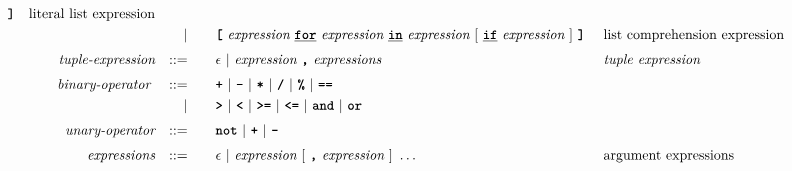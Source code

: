 \begin{alignat*}{9}
                                            \textbf{\texttt{]}}
                                                           && \textrm{literal list expression}\\
&&                       && |   &\quad &&   \textbf{\texttt{[}}\ \textit{expression} \     \textbf{\texttt{\underline{for}}} \ \textit{expression} \ \textbf{\texttt{\underline{in}}} \
                                            \textit{expression} \ [ \ \underline{\textbf{\texttt{if}}} \ \textit{expression} \ ]  \ \textbf{\texttt{]}} \ && \textrm{list comprehension expression}\\[1mm]
&& \textit{tuple-expression}   && ::= &\quad &&  \epsilon \ | \ \textit{expression} \ \textbf{\texttt{,}} \ \textit{expressions}  && \textit{tuple expression}  \\[1mm]
&& \textit{binary-operator}    \ 
                        && ::= &\quad && \textbf{\texttt{+}}\ |\ \textbf{\texttt{-}}\ |\ \textbf{\texttt{*}}\ |\ \textbf{\texttt{/}}\ |\ \textbf{\texttt{\%}}\ |\ 
                                   \textbf{\texttt{==}}\ \\ %
&&                       && |  &\quad &&  \texttt{\textbf{>}}\ |\ \texttt{\textbf{<}}\ |\ \texttt{\textbf{>=}}\ |\ \texttt{\textbf{<=}}\
                                          |\ \textbf{\texttt{and}}\ |\ \texttt{\textbf{or}}\  \\[1mm]
&& \textit{unary-operator}    
                        && ::= &\quad && \textbf{\texttt{not}}\ |\ \textbf{\texttt{+}}\ |\ \textbf{\texttt{-}} \\[1mm]
&& \textit{expressions}  && ::= &\quad && \epsilon\ | \ \textit{expression}\ [
                                                               \ \textbf{\texttt{,}} \
                                                                 \textit{expression} \ 
                                                                      ]\ \ldots
                                                            && \textrm{argument expressions}
\end{alignat*}

\newpage